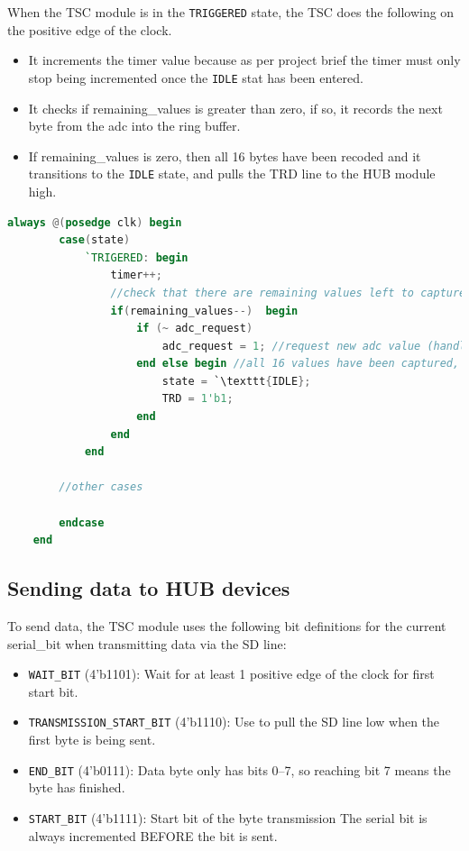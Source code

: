 When the TSC module is in the \texttt{TRIGGERED} state, the TSC does the following on the positive edge of the clock.

\begin{itemize}
    \item It increments the timer value because as per project brief the timer must only stop being incremented once the \texttt{IDLE} stat has been entered.
    \item It checks if remaining\_values is greater than zero, if so, it records the next byte from the adc into the ring buffer.
    \item If remaining\_values is zero, then all 16 bytes have been recoded and it transitions to the \texttt{IDLE} state, and pulls the TRD line to the HUB module high.
\end{itemize}

\begin{lstlisting}[language=Verilog, caption={Verilog code for recording 16 values after a trigger event}, label={lst:triggering2}]
    always @(posedge clk) begin
        case(state)
            `TRIGERED: begin
                timer++;
                //check that there are remaining values left to capture and decrement.
                if(remaining_values--)  begin
                    if (~ adc_request)
                        adc_request = 1; //request new adc value (handled with posedge adc_ready)
                    end else begin //all 16 values have been captured, wait for start or SBF command
                        state = `\texttt{IDLE};
                        TRD = 1'b1;
                    end
                end
            end

        //other cases

        endcase
    end
\end{lstlisting}

\subsection{Sending data to HUB devices}
To send data, the TSC module uses the following bit definitions for the current serial\_bit
when transmitting data via the SD line:

\begin{itemize}
      \item \texttt{WAIT\_BIT} (4'b1101): Wait for at least 1 positive edge of the clock for first start bit.
      \item \texttt{TRANSMISSION\_START\_BIT} (4'b1110): Use to pull the SD line low when the first byte is being sent.
      \item \texttt{END\_BIT} (4'b0111): Data byte only has bits 0--7, so reaching bit 7 means the byte has finished.
      \item \texttt{START\_BIT} (4'b1111): Start bit of the byte transmission
            The serial bit is always incremented BEFORE the bit is sent.
\end{itemize}

